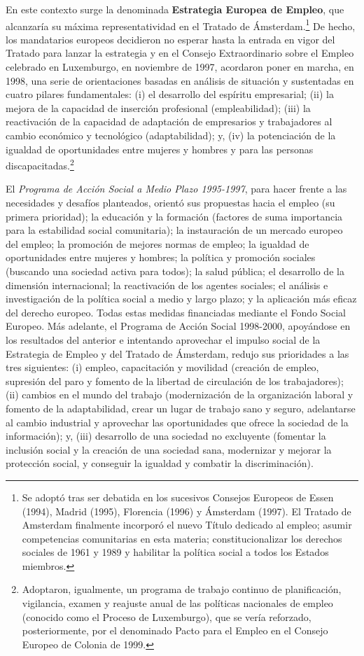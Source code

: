 \documentclass[10pt,a4paper]{article}
\begin{document}
En este contexto surge la denominada \textbf{Estrategia Europea de Empleo}, que alcanzaría su máxima representatividad en el Tratado de Ámsterdam.\footnote{%
    Se adoptó tras ser debatida en los sucesivos Consejos Europeos de Essen (1994), Madrid (1995), Florencia (1996) y Ámsterdam (1997). El Tratado de Amsterdam finalmente incorporó el nuevo Título dedicado al empleo; asumir competencias comunitarias en esta materia; constitucionalizar los derechos sociales de 1961 y 1989 y habilitar la política social a todos los Estados miembros.
} De hecho, los mandatarios europeos decidieron no esperar hasta la entrada en vigor del Tratado para lanzar la estrategia y en el Consejo Extraordinario sobre el Empleo celebrado en Luxemburgo, en noviembre de 1997, acordaron poner en marcha, en 1998, una serie de orientaciones basadas en análisis de situación y sustentadas en cuatro pilares fundamentales: (i) el desarrollo del espíritu empresarial; (ii) la mejora de la capacidad de inserción profesional (empleabilidad); (iii) la reactivación de la capacidad de adaptación de empresarios y trabajadores al cambio económico y tecnológico (adaptabilidad); y, (iv) la potenciación de la igualdad de oportunidades entre mujeres y hombres y para las personas discapacitadas.\footnote{%
    Adoptaron, igualmente, un programa de trabajo continuo de planificación, vigilancia, examen y reajuste anual de las políticas nacionales de empleo (conocido como el Proceso de Luxemburgo), que se vería reforzado, posteriormente, por el denominado Pacto para el Empleo en el Consejo Europeo de Colonia de 1999.
}

El \textit{Programa de Acción Social a Medio Plazo 1995-1997}, para hacer frente a las necesidades y desafíos planteados, orientó sus propuestas hacia el empleo (su primera prioridad); la educación y la formación (factores de suma importancia para la estabilidad social comunitaria); la instauración de un mercado europeo del empleo; la promoción de mejores normas de empleo; la igualdad de oportunidades entre mujeres y hombres; la política y promoción sociales (buscando una sociedad activa para todos); la salud pública; el desarrollo de la dimensión internacional; la reactivación de los agentes sociales; el análisis e investigación de la política social a medio y largo plazo; y la aplicación más eficaz del derecho europeo. Todas estas medidas financiadas mediante el Fondo Social Europeo. Más adelante, el Programa de Acción Social 1998-2000, apoyándose en los resultados del anterior e intentando aprovechar el impulso social de la Estrategia de Empleo y del Tratado de Ámsterdam, redujo sus prioridades a las tres siguientes: (i) empleo, capacitación y movilidad (creación de empleo, supresión del paro y fomento de la libertad de circulación de los trabajadores); (ii) cambios en el mundo del trabajo (modernización de la organización laboral y fomento de la adaptabilidad, crear un lugar de trabajo sano y seguro, adelantarse al cambio industrial y aprovechar las oportunidades que ofrece la sociedad de la información); y, (iii) desarrollo de una sociedad no excluyente (fomentar la inclusión social y la creación de una sociedad sana, modernizar y mejorar la protección social, y conseguir la igualdad y combatir la discriminación).
\end{document}
